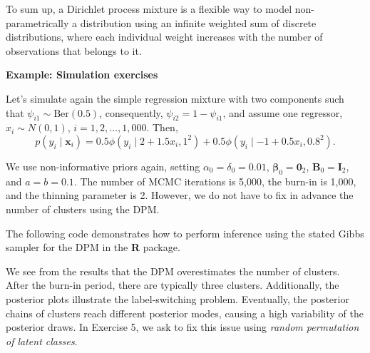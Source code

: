 To sum up, a Dirichlet process mixture is a flexible way to model non-parametrically a distribution using an infinite weighted sum of discrete distributions, where each individual weight increases with the number of observations that belongs to it.

\textbf{Example: Simulation exercises}

Let's simulate again the simple regression mixture with two components such that $\psi_{i1}\sim \text{Ber}(0.5)$, consequently, $\psi_{i2}=1-\psi_{i1}$, and assume one regressor, $x_i\sim N(0,1)$, $i=1,2,\dots,1,000$. Then, 
$$p(y_i \mid \boldsymbol{x}_i) = 
0.5 \phi(y_i \mid 2+1.5x_i,1^2)+0.5 \phi(y_i \mid -1+0.5x_i,0.8^2).$$

We use non-informative priors again, setting $\alpha_{0}=\delta_{0}=0.01$, $\boldsymbol{\beta}_{0}=\boldsymbol{0}_2$, $\boldsymbol{B}_{0}=\boldsymbol{I}_2$, and $a=b=0.1$. The number of MCMC iterations is 5,000, the burn-in is 1,000, and the thinning parameter is 2. However, we do not have to fix in advance the number of clusters using the DPM.

The following code demonstrates how to perform inference using the stated Gibbs sampler for the DPM in the \textbf{R} package.

We see from the results that the DPM overestimates the number of clusters. After the burn-in period, there are typically three clusters. Additionally, the posterior plots illustrate the label-switching problem. Eventually, the posterior chains of clusters reach different posterior modes, causing a high variability of the posterior draws. In Exercise 5, we ask to fix this issue using \textit{random permutation of latent classes}.

